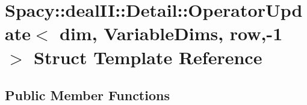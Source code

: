 \hypertarget{structSpacy_1_1dealII_1_1Detail_1_1OperatorUpdate_3_01dim_00_01VariableDims_00_01row_00-1_01_4}{\section{\-Spacy\-:\-:deal\-I\-I\-:\-:\-Detail\-:\-:\-Operator\-Update$<$ dim, \-Variable\-Dims, row,-\/1 $>$ \-Struct \-Template \-Reference}
\label{structSpacy_1_1dealII_1_1Detail_1_1OperatorUpdate_3_01dim_00_01VariableDims_00_01row_00-1_01_4}
}
\subsection*{\-Public \-Member \-Functions}
